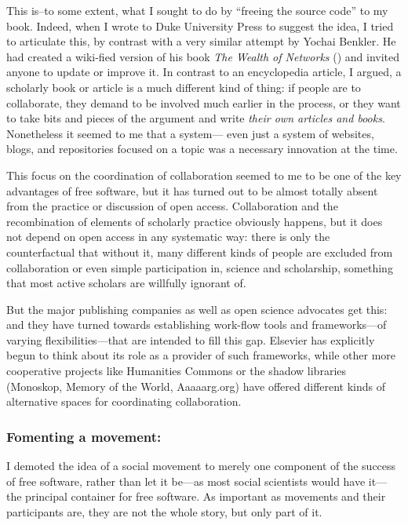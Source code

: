 \documentclass[11pt]{article}
\begin{document}
This is--to some extent, what I sought to do by ``freeing the source code'' to my book.  Indeed, when I wrote to Duke University Press to suggest the idea, I tried to articulate this, by contrast with a very similar attempt by Yochai Benkler.  He had created a wiki-fied version of his book \emph{The Wealth of Networks} (\cite{benkler2007wealnetw}) and invited anyone to update or improve it.  In contrast to an encyclopedia article, I argued, a scholarly book or article is a much different kind of thing:  if people are to collaborate, they demand to be involved much earlier in the process, or they want to take bits and pieces of the argument and write \emph{their own articles and books}.  Nonetheless it seemed to me that a system--- even just a system of websites, blogs, and repositories focused on a topic was a necessary innovation at the time. 

This focus on the coordination of collaboration seemed to me to be one of the key advantages of free software, but it has turned out to be almost totally absent from the practice or discussion of open access.  Collaboration and the recombination of elements of scholarly practice obviously happens, but it does not depend on open access in any systematic way: there is only the counterfactual that without it, many different kinds of people are excluded from collaboration or even simple participation in, science and scholarship, something that most active scholars are willfully ignorant of.

But the major publishing companies as well as open science advocates get this: and they have turned towards establishing work-flow tools and frameworks---of varying flexibilities---that are intended to fill this gap.  Elsevier has explicitly begun to think about its role as a provider of such frameworks, while other more cooperative projects like Humanities Commons or the shadow libraries (Monoskop, Memory of the World, Aaaaarg.org) have offered different kinds of alternative spaces for coordinating collaboration.

\subsubsection*{\textbf{Fomenting a movement}:}
\label{sec:org920c25a}

I demoted the idea of a social movement to merely one component of the success of free software, rather than let it be---as most social scientists would have it---the principal container for free software.  As important as movements and their participants are, they are not the whole story, but only part of it.  
\end{document}
